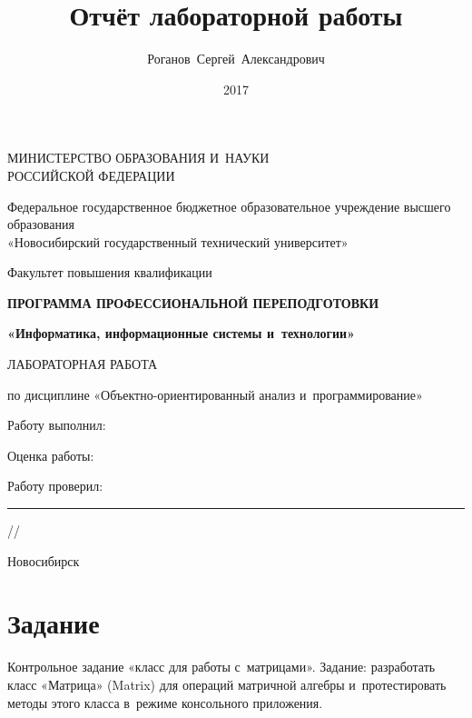 \documentclass[a4paper,14pt]{extreport}
\title{Отчёт лабораторной работы}
\author{Роганов\ Сергей\ Александрович}
\date{2017}
\begin{document}
\makeatletter
\begin{titlepage}
	\begin{center}
		\MakeUppercase{Министерство образования и науки\protect\\
		российской федерации}
		
		\vspace{\baselineskip}
		Федеральное государственное бюджетное образовательное учреждение высшего образования\\
		«Новосибирский государственный технический университет»
		
		\vspace{\baselineskip}
		Факультет повышения квалификации
		
		\vfill{}
		\MakeUppercase{\bf Программа профессиональной переподготовки}
		
		\vspace{.5\baselineskip}
		\textbf{«Информатика, информационные системы и технологии»}
		
		\vfill{}
		\MakeUppercase{\large Лабораторная работа}
		
		\vspace{.5\baselineskip}
		по дисциплине «Объектно-ориентированный анализ и программирование»
		
		\vfill{}
		{\flushright
			Работу выполнил:\\
			{\@author}
			
			\vspace{2\baselineskip}
			Оценка работы:
			
			\vspace{2\baselineskip}
			Работу проверил:
			
			\vspace{2\baselineskip}
			\hfill\rule{.25\textwidth}{.2pt}/\hspace{.25\textwidth}/
		}
		
		\vfill{}
		Новосибирск \@date
	\end{center}
\end{titlepage}
\makeatother

\tableofcontents{}

\chapter*{Задание}
	\label{chapter:task}
Контрольное задание «класс для работы с матрицами».
Задание: разработать класс «Матрица» (Matrix) для операций матричной алгебры и протестировать методы этого класса в режиме консольного приложения.
\end{document}
